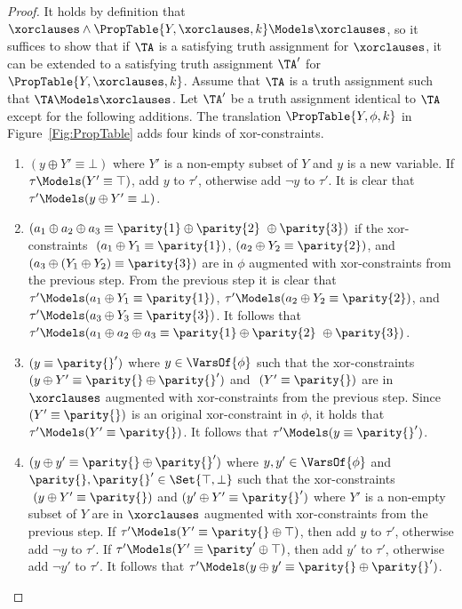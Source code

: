 \begin{proof}
It holds by definition that $ \xorclauses \wedge \PropTable{Y, \xorclauses,k} \Models
\xorclauses$, so it suffices to show that if $\TA$ is a satisfying truth
assignment for $\xorclauses$, it can be extended to a satisfying truth
assignment $\TA'$ for $\PropTable{Y, \xorclauses, k}$. 
Assume that $\TA$ is a truth assignment such that $\TA \Models \xorclauses$.
Let $\TA'$ be a truth assignment identical to $\TA$ except for the following additions. The translation $\PropTable{Y,\phi,k}$ in Figure~\ref{Fig:PropTable} adds four kinds of xor-constraints.
\begin{enumerate}
\item $ (y \oplus Y' \equiv \bot) $ where $ Y' $ is a non-empty subset of $Y$
and $y$ is a new variable. If $ \tau \Models (Y' \equiv \top) $, add $y$ to $\tau'$, otherwise add $\neg y$ to $\tau'$. It is clear that $ \tau' \Models (y \oplus Y' \equiv \bot) $.

\item $ (a_1 \oplus a_2 \oplus a_3 \equiv \parity{1} \oplus \parity{2} \oplus
\parity{3}) $ if the xor-constraints $ (a_1 \oplus Y_1 \equiv \parity{1})
$, $ (a_2 \oplus Y_2 \equiv \parity{2})$, and $ (a_3 \oplus (Y_1 \oplus Y_2)
\equiv \parity{3}) $ are in $\phi$ augmented with xor-constraints from the
previous step.
From the previous step it is clear that $ \tau' \Models (a_1 \oplus Y_1 \equiv
\parity{1}) $, $\tau' \Models (a_2 \oplus Y_2 \equiv \parity{2}) $, and
$\tau' \Models (a_3 \oplus Y_3 \equiv \parity{3}) $. It follows that $\tau'
\Models (a_1 \oplus a_2 \oplus a_3 \equiv \parity{1} \oplus \parity{2} \oplus
\parity{3})$.

\item $ (y \equiv \parity{}') $ where $ y \in \VarsOf{\phi} $ such that
the xor-constraints $ (y \oplus Y' \equiv \parity{} \oplus \parity{}') $ and $ (Y' \equiv \parity{}) $ are in $\xorclauses$ augmented with xor-constraints from the previous step. Since $ (Y' \equiv \parity{}) $ is an original xor-constraint in $\phi$,
    it holds that $\tau' \Models (Y' \equiv \parity{}) $. It follows that $\tau' \Models (y \equiv \parity{}') $.

\item $ (y \oplus y' \equiv \parity{} \oplus \parity{}') $ where $ y, y' \in \VarsOf{\phi} $ and $ \parity{}, \parity{}' \in \Set{\top,\bot}$ such that
the xor-constraints $ (y \oplus Y' \equiv \parity{}) $ and $ (y' \oplus Y' \equiv \parity{}') $ where $Y'$ is a non-empty subset of $Y$
are in $\xorclauses$ augmented with xor-constraints from the previous step. If $ \tau' \Models (Y' \equiv \parity{} \oplus \top) $, then add $ y $ to $ \tau'$, otherwise add $ \neg y $ to $\tau'$. If $ \tau' \Models (Y' \equiv \parity'{} \oplus \top)$, then add $ y' $ to $ \tau'$, otherwise add $ \neg y' $ to $\tau'$.
It follows that $ \tau' \Models (y \oplus y' \equiv \parity{} \oplus \parity{}')$.
\end{enumerate}
\end{proof}

